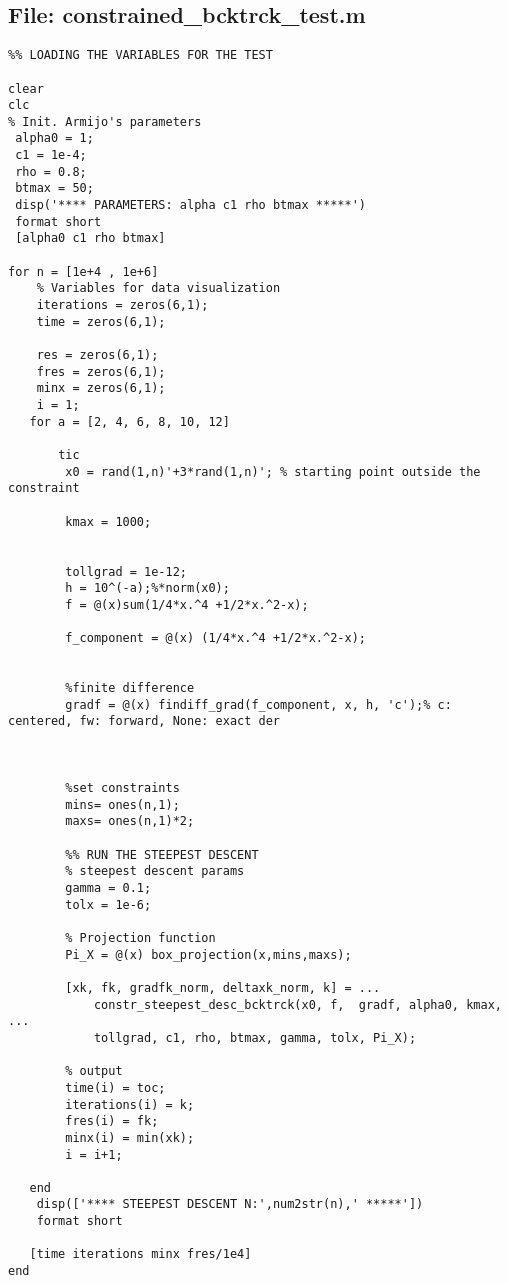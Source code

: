 \documentclass{article}
\begin{document}
\subsection{File: constrained\_bcktrck\_test.m}
\begin{verbatim}
%% LOADING THE VARIABLES FOR THE TEST

clear 
clc
% Init. Armijo's parameters
 alpha0 = 1;
 c1 = 1e-4;
 rho = 0.8;
 btmax = 50;
 disp('**** PARAMETERS: alpha c1 rho btmax *****')
 format short  
 [alpha0 c1 rho btmax]

for n = [1e+4 , 1e+6]
    % Variables for data visualization
    iterations = zeros(6,1);
    time = zeros(6,1);
    
    res = zeros(6,1);
    fres = zeros(6,1);
    minx = zeros(6,1);
    i = 1;
   for a = [2, 4, 6, 8, 10, 12]

       tic
        x0 = rand(1,n)'+3*rand(1,n)'; % starting point outside the constraint
        
        kmax = 1000;
        
       
        tollgrad = 1e-12;
        h = 10^(-a);%*norm(x0);
        f = @(x)sum(1/4*x.^4 +1/2*x.^2-x);

        f_component = @(x) (1/4*x.^4 +1/2*x.^2-x);
        
        
        %finite difference
        gradf = @(x) findiff_grad(f_component, x, h, 'c');% c: centered, fw: forward, None: exact der
        
       
        
        %set constraints
        mins= ones(n,1);
        maxs= ones(n,1)*2;

        %% RUN THE STEEPEST DESCENT
        % steepest descent params
        gamma = 0.1;
        tolx = 1e-6;
        
        % Projection function
        Pi_X = @(x) box_projection(x,mins,maxs);     
        
        [xk, fk, gradfk_norm, deltaxk_norm, k] = ...
            constr_steepest_desc_bcktrck(x0, f,  gradf, alpha0, kmax, ...
            tollgrad, c1, rho, btmax, gamma, tolx, Pi_X);
        
        % output
        time(i) = toc;
        iterations(i) = k;
        fres(i) = fk;
        minx(i) = min(xk);
        i = i+1;
        
   end
    disp(['**** STEEPEST DESCENT N:',num2str(n),' *****'])
    format short

   [time iterations minx fres/1e4]
end


\end{verbatim}
\end{document}
